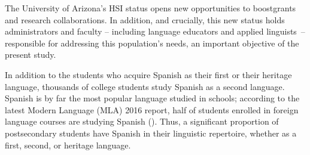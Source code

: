 \documentclass[output=paper]{../langscibook}
\begin{document}
The University of Arizona’s HSI status opens new opportunities to boost\linebreak grants and research collaborations. In addition, and crucially, this new status holds administrators and faculty -- including language educators and applied linguists~-- responsible for addressing this population’s needs, an important objective of the present study.

In addition to the students who acquire Spanish as their first or their heritage language, thousands of college students study Spanish as a second language. Spanish is by far the most popular language studied in schools; according to the latest Modern Language (MLA) 2016 report, half of students enrolled in foreign language courses are studying Spanish (). Thus, a significant proportion of postsecondary students have Spanish in their linguistic repertoire, whether as a first, second, or heritage language.
\end{document}
